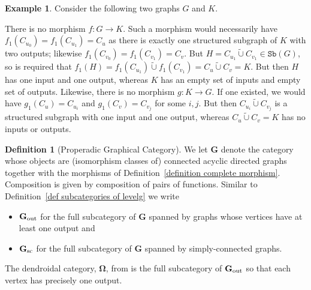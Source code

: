 \documentclass{amsart}
\numberwithin{theorem}{subsection}
\theoremstyle{definition}
\newtheorem{definition}[theorem]{Definition}
\newtheorem{example}[theorem]{Example}
\newcommand{\name}[1]{\ensuremath{\text{\textup{#1}}}}
\newcommand{\bbO}{\mathbf{\Omega}}
\newcommand{\bbY}{\mathbf{G}}
\newcommand{\bbYout}{\bbY_{\name{out}}}
\newcommand{\sub}{\mathtt{Sb}}
\newcommand{\strcup}{\mathbin{\tilde \cup}}
\begin{document}
\begin{example}\label{example of etale but not mono}
Consider the following two graphs $G$ and $K$.
\begin{center}
\end{center}
There is no morphism $f \colon G \to K$.
Such a morphism would necessarily have $f_1(C_{u_0}) = f_1(C_{u_1}) = C_u$ as there is exactly one structured subgraph of $K$ with two outputs; likewise $f_1(C_{v_0}) = f_1(C_{v_1}) = C_v$.
But $H = C_{u_1} \strcup C_{v_1} \in \sub(G)$, so is required that $f_1(H) = f_1(C_{u_1}) \strcup f_1(C_{v_1}) = C_u \strcup C_v = K$.
But then $H$ has one input and one output, whereas $K$ has an empty set of inputs and empty set of outputs.
Likewise, there is no morphism $g \colon K \to G$.
If one existed, we would have $g_1(C_u) = C_{u_i}$ and $g_1(C_v) = C_{v_j}$ for some $i,j$.
But then $C_{u_i} \strcup C_{v_j}$ is a structured subgraph with one input and one output, whereas $C_u \strcup C_v = K$ has no inputs or outputs.
\end{example}

\begin{definition}[Properadic Graphical Category]\label{def Y}
We let $\bbY$ denote the category whose objects are (isomorphism classes of) connected acyclic directed graphs together with the morphisms of Definition~\ref{definition complete morphism}.
Composition is given by composition of pairs of functions. Similar to Definition~\ref{def subcategories of levelg} we write
\begin{itemize}
	\item $\bbYout$ for the full subcategory of $\bbY$ spanned by graphs whose vertices have at least one output and 
	\item $\bbY_{\name{sc}}$ for the full subcategory of $\bbY$ spanned by simply-connected graphs.
\end{itemize}
The dendroidal category, $\bbO$, from \cite{MoerdijkWeiss} is the full subcategory of $\bbYout$ so that each vertex has precisely one output.
\end{definition}
\end{document}
